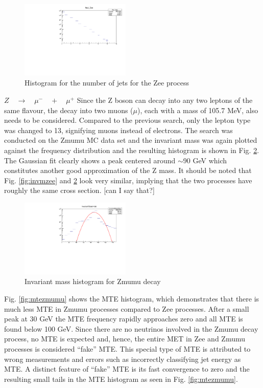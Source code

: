 \documentclass[runningheads,a4paper]{llncs}
\begin{document}
\begin{figure}
\centering
\includegraphics[height=3.7cm]{NoJ_Zee+new}
\caption{Histogram for the number of jets for the Zee process}
\label{fig:nojzee}
\end{figure}
\bigbreak
$Z\quad \rightarrow \quad { \mu  }^{ - }\quad +\quad { \mu  }^{ + }$
\smallbreak
Since the Z boson can decay into any two leptons of the same flavour, the decay into two muons ($\mu$), each with a mass of 105.7 MeV, also needs to be considered. Compared to the previous search, only the lepton type was changed to 13, signifying muons instead of electrons. The search was conducted on the Zmumu MC data set and the invariant mass was again plotted against the frequency distribution and the resulting histogram is shown in Fig. \ref{fig:invmzmumu}. The Gaussian fit clearly shows a peak centered around $\sim$90 GeV which constitutes another good approximation of the Z mass. It should be noted that Fig. \ref{fig:invmzee} and \ref{fig:invmzmumu} look very similar, implying that the two processes have roughly the same cross section. [can I say that?]

\begin{figure}
\centering
\includegraphics[height=3.7cm]{InvM_Zmumu_fit}
\caption{Invariant mass histogram for Zmumu decay}
\label{fig:invmzmumu}
\end{figure}

Fig. \ref{fig:mtezmumu} shows the MTE histogram, which demonstrates that there is much less MTE in Zmumu processes compared to Zee processes. After a small peak at 30 GeV the MTE frequency rapidly approaches zero and all MTE is found below 100 GeV. Since there are no neutrinos involved in the Zmumu decay process, no MTE is expected and, hence, the entire MET in Zee and Zmumu processes is considered “fake” MTE. This special type of MTE is attributed to wrong measurements and errors such as incorrectly classifying jet energy as MTE. A distinct feature of “fake” MTE is its fast convergence to zero and the resulting small tails in the MTE histogram as seen in Fig. \ref{fig:mtezmumu}.
\end{document}
